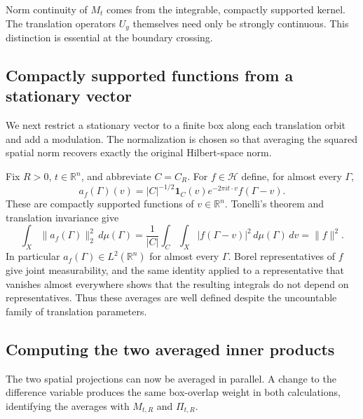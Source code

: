 \documentclass[a4paper,12pt,reqno]{amsart}
\newcommand{\lead}[1]{\par\smallskip\noindent\leavevmode#1\par\smallskip}
\theoremstyle{remark}
\numberwithin{equation}{section}
\newcommand{\R}{\mathbb R}
\newcommand{\Hh}{\mathcal H}
\newcommand{\one}{\mathbf 1}
\begin{document}
Norm continuity of $M_t$ comes from the integrable, compactly supported
kernel. The translation operators $U_y$ themselves need only be strongly
continuous. This distinction is essential at the boundary crossing.

\subsection{Compactly supported functions from a stationary vector}

\lead{We next restrict a stationary vector to a finite box along each
translation orbit and add a modulation. The normalization is chosen so
that averaging the squared spatial norm recovers exactly the original
Hilbert-space norm.}


Fix $R>0$, $t\in\R^n$, and abbreviate $C=C_R$. For $f\in\Hh$ define,
for almost every $\Gamma$,
\begin{equation}\label{eq:finite-test}
 a_f(\Gamma)(v)=|C|^{-1/2}\one_C(v)e^{-2\pi it\cdot v}f(\Gamma-v).
\end{equation}
These are compactly supported functions of $v\in\R^n$. Tonelli's theorem and
translation invariance give
\begin{equation}\label{eq:finite-energy}
 \int_X\|a_f(\Gamma)\|_2^2\,d\mu(\Gamma)
 =\frac{1}{|C|}\int_C\int_X|f(\Gamma-v)|^2\,d\mu(\Gamma)\,dv
 =\|f\|^2.
\end{equation}
In particular $a_f(\Gamma)\in L^2(\R^n)$ for almost every $\Gamma$.
Borel representatives of $f$ give joint measurability, and the same
identity applied to a representative that vanishes almost everywhere
shows that the resulting integrals do not depend on representatives.
Thus these averages are well defined despite the uncountable family of
translation parameters.

\subsection{Computing the two averaged inner products}

\lead{The two spatial projections can now be averaged in parallel. A
change to the difference variable produces the same box-overlap weight in
both calculations, identifying the averages with $M_{t,R}$ and
$\Pi_{t,R}$.}
\end{document}
